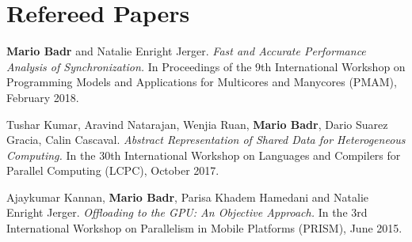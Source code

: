 \section{\sc Refereed Papers}

\onerow
{
  \textbf{Mario Badr} and Natalie Enright Jerger.
  \textit{Fast and Accurate Performance Analysis of Synchronization.}
  In Proceedings of the 9th International Workshop on Programming Models and Applications for Multicores and Manycores (PMAM), February 2018.
}

\onerow
{
  Tushar Kumar, Aravind Natarajan, Wenjia Ruan, \textbf{Mario Badr}, Dario Suarez Gracia, Calin Cascaval.
  \textit{Abstract Representation of Shared Data for Heterogeneous Computing.}
  In the 30th International Workshop on Languages and Compilers for Parallel Computing (LCPC), October 2017.
}

\onerow
{
  Ajaykumar Kannan, \textbf{Mario Badr}, Parisa Khadem Hamedani and Natalie Enright Jerger.
  \textit{Offloading to the GPU: An Objective Approach.}
  In the 3rd International Workshop on Parallelism in Mobile Platforms (PRISM), June 2015.
}
